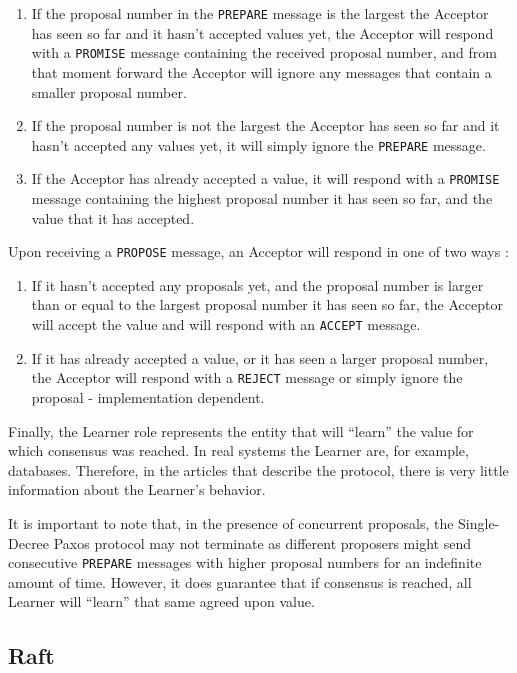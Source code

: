\begin{enumerate}
  \item If the proposal number in the \texttt{PREPARE} message is the largest the Acceptor has seen so far and it hasn’t accepted values yet, the Acceptor will respond with a \texttt{PROMISE} message containing the received proposal number, and from that moment forward the Acceptor will ignore any messages that contain a smaller proposal number.
  \item If the proposal number is not the largest the Acceptor has seen so far and it hasn’t accepted any values yet, it will simply ignore the \texttt{PREPARE} message.
  \item If the Acceptor has already accepted a value, it will respond with a \texttt{PROMISE} message containing the highest proposal number it has seen so far, and the value that it has accepted.
\end{enumerate}

Upon receiving a \texttt{PROPOSE} message, an Acceptor will respond in one of two ways \cite{paxos_made_simple}:

\begin{enumerate}
  \item If it hasn’t accepted any proposals yet, and the proposal number is larger than or equal to the largest proposal number it has seen so far, the Acceptor will accept the value and will respond with an \texttt{ACCEPT} message.
  \item If it has already accepted a value, or it has seen a larger proposal number, the Acceptor will respond with a \texttt{REJECT} message or simply ignore the proposal - implementation dependent.
\end{enumerate}

Finally, the Learner role represents the entity that will “learn” the value for which consensus was reached. In real systems the Learner are, for example, databases. Therefore, in the articles that describe the protocol, there is very little information about the Learner’s behavior.


It is important to note that, in the presence of concurrent proposals, the Single-Decree Paxos protocol may not terminate as different proposers might send consecutive \texttt{PREPARE} messages with higher proposal numbers for an indefinite amount of time. However, it does guarantee that if consensus is reached, all Learner will “learn” that same agreed upon value.




\subsection{Raft}


